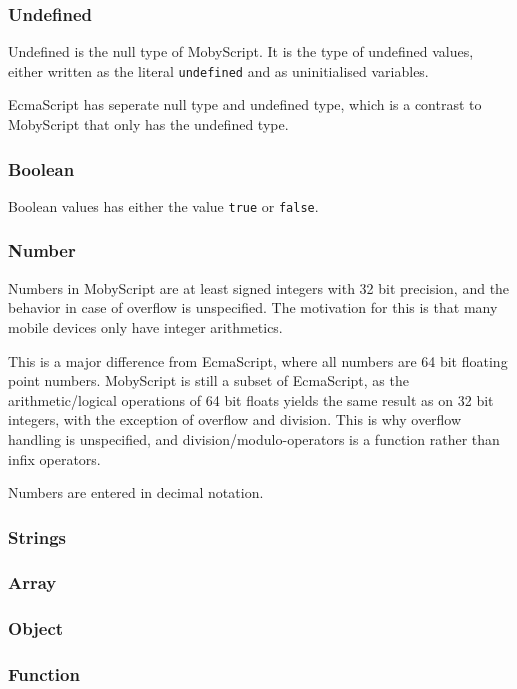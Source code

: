 \subsubsection{Undefined}

Undefined is the null type of MobyScript. It is the type of undefined values, either written as the literal \verb|undefined| and as uninitialised variables.

EcmaScript has seperate null type and undefined type, which is a contrast to MobyScript that only has the undefined type. 

\subsubsection{Boolean}
Boolean values has either the value \verb|true| or \verb|false|.

\subsubsection{Number}

Numbers in MobyScript are at least signed integers with 32 bit precision, and the behavior in case of overflow is unspecified. 
The motivation for this is that many mobile devices only have integer arithmetics.

This is a major difference from EcmaScript, where all numbers are 64 bit floating point numbers. 
MobyScript is still a subset of EcmaScript, as the arithmetic/logical operations of 64 bit floats yields the same result as on 32 bit integers, with the exception of overflow and division. This is why overflow handling is unspecified, and division/modulo-operators is a function rather than infix operators.

Numbers are entered in decimal notation.

\subsubsection{Strings}

\subsubsection{Array}
\subsubsection{Object}
\subsubsection{Function}
